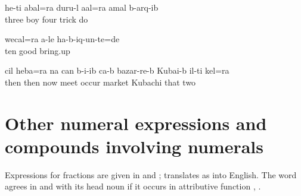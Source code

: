 \ea\label{ex:mythreechildrenallplayedtricks}
\gll	he{\uvfr}-t{\lmk}i	{\eppl}a{\pha}bal=ra	dur{\phfr}u{\pha}-l	a{\vuvfr}{\lab}al=ra	{\eppl}a{\pha}mal	b-arq{\ej}-ib\\
		three	boy	four	trick	do\\
\glt	{}
\z

\ea\label{ex:allchildrenwerebroughtupwell}
\gll	wec{\ej}al=ra	{\eppl}a{\pha}{\phfr}-le	ha-b-iq{\ej}-un-te=de\\
	ten	good	bring.up\\
\glt	{}
\z

\ea\label{ex:thenthesetwoalsometonthemarket}
\gll	c{\ej}il	heba=ra	na	can	b-i{\paaf}-ib ca-b	bazar-re-b	Kuba{\paaf}i-b	il-t{\lmk}i	k{\ej}{\lab}el=ra\\
	then	then	now	meet	occur 	market	Kubachi	that	two\\
\glt	{}
\z


\newpage

\section{Other numeral expressions and compounds involving numerals}
\label{sec:othernumeralexpressions}

Expressions for fractions are given in  and ;  translates as  into English. The word   agrees in  and  with its head noun if it occurs in attributive function , .
%
\begin{exe}
	\ex	\label{ex:fractions}
		\TabPositions{12em}
			 \tab {}  \\
			 \tab {}	
\end{exe}


